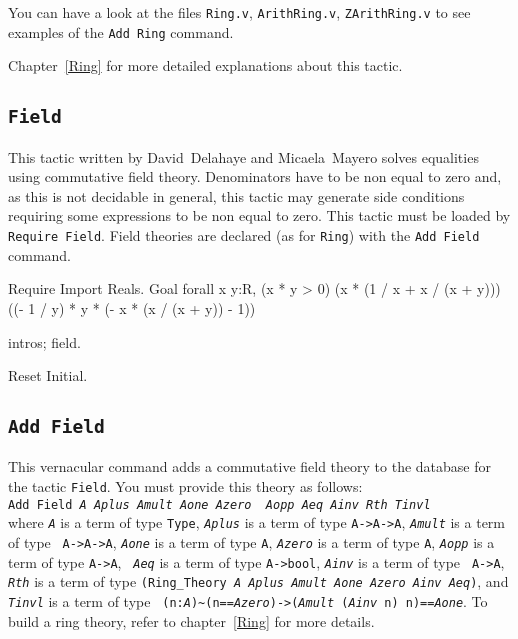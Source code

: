You can have a look at the files \texttt{Ring.v},
\texttt{ArithRing.v}, \texttt{ZArithRing.v} to see examples of the
\texttt{Add Ring} command.

\SeeAlso Chapter~\ref{Ring} for more detailed explanations about this tactic.

\subsection{\tt Field}

This tactic written by David~Delahaye and Micaela~Mayero solves equalities
using commutative field theory. Denominators have to be non equal to zero and,
as this is not decidable in general, this tactic may generate side conditions
requiring some expressions to be non equal to zero. This tactic must be loaded
by {\tt Require Field}. Field theories are declared (as for {\tt Ring}) with
the {\tt Add Field} command.

\Example
\begin{coq_example*}
Require Import Reals.
Goal
  forall x y:R,
    (x * y > 0)%
    (x * (1 / x + x / (x + y)))%
    ((- 1 / y) * y * (- x * (x / (x + y)) - 1))%
\end{coq_example*}

\begin{coq_example}
intros; field.
\end{coq_example}

\begin{coq_eval}
Reset Initial.
\end{coq_eval}

\subsection{\tt Add Field}

This vernacular command adds a commutative field theory to the database for the
tactic {\tt Field}. You must provide this theory as follows:\\

{\tt Add Field {\it A} {\it Aplus} {\it Amult} {\it Aone} {\it Azero} {\it
Aopp} {\it Aeq} {\it Ainv} {\it Rth} {\it Tinvl}}\\

\noindent where {\tt {\it A}} is a term of type {\tt Type}, {\tt {\it Aplus}}
is a term of type {\tt A->A->A}, {\tt {\it Amult}} is a term of type {\tt
A->A->A}, {\tt {\it Aone}} is a term of type {\tt A}, {\tt {\it Azero}} is a
term of type {\tt A}, {\tt {\it Aopp}} is a term of type {\tt A->A}, {\tt {\it
Aeq}} is a term of type {\tt A->bool}, {\tt {\it Ainv}} is a term of type {\tt
A->A}, {\tt {\it Rth}} is a term of type {\tt (Ring\_Theory {\it A Aplus Amult
Aone Azero Ainv Aeq})}, and {\tt {\it Tinvl}} is a term of type {\tt
(n:{\it A}){\~{}}(n=={\it Azero})->({\it Amult} ({\it Ainv} n) n)=={\it Aone}}.
To build a ring theory, refer to chapter~\ref{Ring} for more details.

